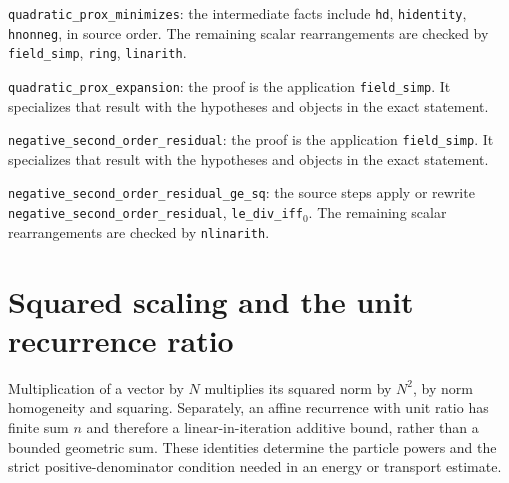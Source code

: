 \documentclass[11pt,a4paper]{article}
\begin{document}
\begin{leanbox}
\texttt{quadratic\_\allowbreak{}prox\_\allowbreak{}minimizes}: the intermediate facts include \texttt{hd}, \texttt{hidentity}, \texttt{hnonneg}, in source order. The remaining scalar rearrangements are checked by \texttt{field\_\allowbreak{}simp}, \texttt{ring}, \texttt{linarith}.



\texttt{quadratic\_\allowbreak{}prox\_\allowbreak{}expansion}: the proof is the application \texttt{field\_\allowbreak{}simp}. It specializes that result with the hypotheses and objects in the exact statement.



\texttt{negative\_\allowbreak{}second\_\allowbreak{}order\_\allowbreak{}residual}: the proof is the application \texttt{field\_\allowbreak{}simp}. It specializes that result with the hypotheses and objects in the exact statement.



\texttt{negative\_\allowbreak{}second\_\allowbreak{}order\_\allowbreak{}residual\_\allowbreak{}ge\_\allowbreak{}sq}: the source steps apply or rewrite \texttt{negative\_\allowbreak{}second\_\allowbreak{}order\_\allowbreak{}residual}, \texttt{le\_\allowbreak{}div\_\allowbreak{}iff\ensuremath{{}_{0}}}. The remaining scalar rearrangements are checked by \texttt{nlinarith}.
\end{leanbox}

\section{\texorpdfstring{Squared scaling and the unit recurrence ratio}{Squared scaling and the unit recurrence ratio}}


Multiplication of a vector by \(N\) multiplies its squared norm by \(N^2\), by norm homogeneity and squaring. Separately, an affine recurrence with unit ratio has finite sum \(n\) and therefore a linear-in-iteration additive bound, rather than a bounded geometric sum. These identities determine the particle powers and the strict positive-denominator condition needed in an energy or transport estimate.
\end{document}
